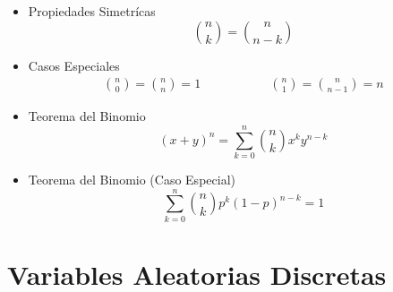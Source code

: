 \documentclass[12pt, fleqn]{report}                             %
\DeclareMathOperator \MegaSpace {\quad \quad}                   %
\theoremstyle{break}                                            %
\begin{document}
                \begin{itemize}

                    \item 
                        Propiedades Simetrícas
                        \begin{equation*}
                            {n \choose k} = {n \choose n - k}
                        \end{equation*}

                    \item 
                        Casos Especiales
                        \begin{align*}
                            {n \choose 0} = {n \choose n} = 1
                            \MegaSpace \MegaSpace
                            {n \choose 1} = {n \choose n-1} = n   
                        \end{align*}

                    \item 
                        Teorema del Binomio
                        \begin{equation*}
                            (x + y)^n 
                                = \sum_{k=0}^n {n \choose k} x^k y^{n-k}
                        \end{equation*}


                    \item 
                        Teorema del Binomio (Caso Especial)
                        \begin{equation*}
                            \sum_{k=0}^n {n \choose k} p^k (1 - p)^{n-k} = 1
                        \end{equation*}

                \end{itemize}






\part{Variables Aleatorias Discretas}
\clearpage
\end{document}
